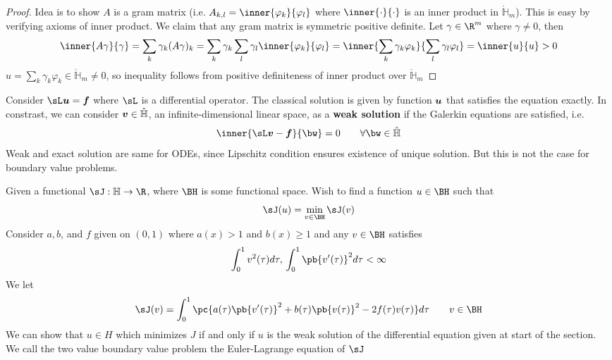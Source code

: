 \documentclass[11pt]{article}
\begin{document}
\begin{proposition*}
    \begin{proof}
        Idea is to show $A$ is a gram matrix (i.e. $A_{k,l} = \inner{\varphi_k}{\varphi_l}$ where $\inner{\cdot}{\cdot}$ is an inner product in $\mathring{\mathbb{H}}_m$). This is easy by verifying axioms of inner product. We claim that any gram matrix is symmetric positive definite. Let $\gamma\in\R^m$ where $\gamma \neq 0$, then 
        \[
            \inner{A\gamma}{\gamma} 
            = \sum_k \gamma_k (A\gamma)_k 
            = \sum_k \gamma_k \sum_l \gamma_l \inner{\varphi_k}{\varphi_l}
            = \inner{\sum_k \gamma_k\varphi_k}{\sum_l \gamma_l\varphi_l} 
            = \inner{u}{u}
            > 0    
        \]
        $u = \sum_k \gamma_k\varphi_k \in \mathring{\mathbb{H}}_m \neq 0$, so inequality follows from positive definiteness of inner product over $\mathring{\mathbb{H}}_m$
    \end{proof}
\end{proposition*}


\begin{definition*}
     Consider $\mathbb{\sL} \bu = \bf$ where $\mathbb{\sL}$ is a differential operator. The classical solution is given by function $\bm{u}$ that satisfies the equation exactly. In constrast, we can consider $\bm{v} \in\mathring{\mathbb{H}}$, an infinite-dimensional linear space, as a \textbf{weak solution} if the Galerkin equations are satisfied, i.e. 
    \[
        \inner{\mathbb{\sL}\bv - \bf}{\bw} = 0
        \quad \quad 
        \forall \bw \in \mathring{\mathbb{H}}
    \]
    Weak and exact solution are same for ODEs, since Lipschitz condition ensures existence of unique solution. But this is not the case for boundary value problems.
\end{definition*}


\begin{definition*}
     Given a functional $\sJ: \mathbb{H} \to\R$, where $\BH$ is some functional space. Wish to find a function $u\in\BH$ such that 
    \[
        \sJ(u) = \min_{v\in\BH} \sJ(v)    
    \]
    Consider $a,b$, and $f$ given on $(0,1)$ where $a(x)>1$ and $b(x)\geq 1$ and any $v\in\BH$ satisfies
    \[
        \int_0^1 v^2(\tau) d\tau 
        ,\, 
        \int_0^1 \pb{v'(\tau)}^2 d\tau < \infty
    \]
    We let 
    \[
        \sJ(v) = \int_0^1 \pc{
            a(\tau) \pb{v'(\tau)}^2 + b(\tau) \pb{v(\tau)}^2 - 2f(\tau)v(\tau)
        } d\tau
        \quad \quad v\in\BH
    \]
    We can show that $u\in H$ which minimizes $J$ if and only if $u$ is the weak solution of the differential equation given at start of the section. We call the two value boundary value problem the Euler-Lagrange equation of $\sJ$
\end{definition*}
\end{document}
